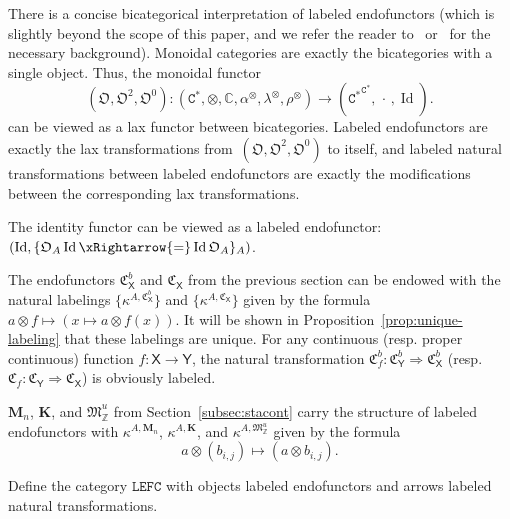 \documentclass[10pt]{simplearticle}
\newcommand{\Id}{\operatorname{Id}}
\newcommand{\LEFC}{\mathbb{\mathtt{LEFC}}}
\newcommand{\Cstar}{\mathtt{C^{*}}}
\newcommand{\EFC}{\Cstar^{\Cstar}}
\newcommand{\C}{\mathfrak{C}^{\,}}
\newcommand{\fK}{\mathbf{K}}
\newcommand{\fM}{\mathbf{M}}
\newcommand{\singledot}{\,\cdot\,}
\begin{document}
\begin{rem}\label{rem:bicat-interpr}
There
is a concise bicategorical
interpretation of labeled endofunctors (which is slightly beyond the
scope of this paper, and we refer the reader to~\cite{JY2021} or~\cite{leinster1998basicbicategories}
for the necessary background). Monoidal categories are exactly the
bicategories with a single object. Thus, the monoidal functor
\[
(\mathfrak{O},\mathfrak{O}^{2},\mathfrak{O}^{0})\colon(\Cstar,\otimes,\mathbb{C},\alpha^{\otimes},\lambda^{\otimes},\rho^{\otimes})\to(\EFC,\singledot,\Id).
\]
can be viewed as a lax functor between bicategories. Labeled endofunctors
are exactly the lax transformations from~$(\mathfrak{O},\mathfrak{O}^{2},\mathfrak{O}^{0})$
to itself, and labeled natural transformations between labeled endofunctors
are exactly the modifications between the corresponding lax transformations.
\end{rem}

\begin{example}
The identity functor can be viewed as a labeled endofunctor: $(\Id,\{\mathfrak{O}_{A}\Id\xRightarrow{=}\Id\mathfrak{O}_{A}\}_{A})$.
\end{example}

\begin{example}\label{exa:CX-labeled}
The endofunctors $\mathfrak{C}^{b}_{\mathsf{X}}$
and $\C_{\mathsf{X}}$ from the previous section can be endowed with
the natural labelings $\{\kappa^{A,\mathfrak{C}^{b}_{\mathsf{X}}}\}$
and $\{\kappa^{A,\C_{\mathsf{X}}}\}$ given by the formula $a\otimes f\mapsto(x\mapsto a\otimes f(x))$.
It will be shown in Proposition~\ref{prop:unique-labeling} that
these labelings are unique. For any continuous (resp. proper continuous)
function $f\colon\mathsf{X}\to\mathsf{Y}$, the natural transformation
$\mathfrak{C}^{b}_{f}\colon\mathfrak{C}^{b}_{\mathsf{Y}}\Rightarrow\mathfrak{C}^{b}_{\mathsf{X}}$
(resp. $\C_{f}\colon\C_{\mathsf{Y}}\Rightarrow\C_{\mathsf{X}}$) is
obviously labeled.
\end{example}

\begin{example}\label{exa:mat-labeled}
$\fM_{n}$, $\fK$, and $\mathfrak{M}^{u}_{\mathbb{Z}}$
from Section~\ref{subsec:stacont} carry the structure of labeled
endofunctors with $\kappa^{A,\fM_{n}}$, $\kappa^{A,\fK}$, and $\kappa^{A,\mathfrak{M}^{u}_{\mathbb{Z}}}$
given by the formula
\[
a\otimes(b_{i,j})\mapsto(a\otimes b_{i,j}).
\]
\end{example}

\begin{defn}\label{def:lefc-2cat}
Define the category $\LEFC$ with objects labeled
endofunctors and arrows labeled natural transformations.
\end{defn}
\end{document}
